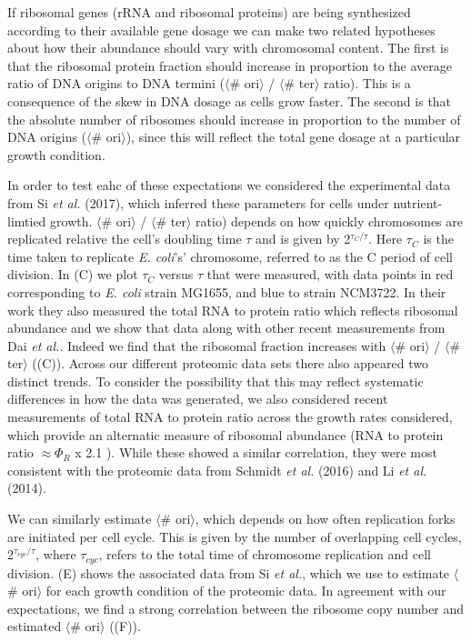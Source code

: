 If ribosomal genes (rRNA and ribosomal proteins) are being synthesized according
to their available gene dosage we can make two related hypotheses about how
their abundance should vary with chromosomal content. The first is that the
ribosomal protein fraction should increase in proportion  to the average ratio of
DNA origins to DNA termini ($\langle$\# ori$\rangle$ / $\langle$\# ter$\rangle$
ratio). This is a consequence of the skew in DNA dosage as cells grow faster.
The second is that the absolute number of ribosomes should increase in proportion to the number of DNA origins ($\langle$\# ori$\rangle$), since this will reflect the total gene dosage at a particular growth condition.

In order to test eahc of these expectations we considered the experimental data
from Si \textit{et al.} (2017), which inferred these parameters for cells under
nutrient-limtied growth. $\langle$\# ori$\rangle$ / $\langle$\# ter$\rangle$
ratio) depends on how quickly chromosomes are replicated relative the cell's
doubling time $\tau$ and is given by 2$^{\tau_C / \tau}$. Here $\tau_C$ is the
time taken to replicate \textit{E. coli}'s' chromosome, referred to as the C
period of cell division.  In (C) we plot $\tau_C$ versus
$\tau$ that were measured, with data points in red corresponding to \textit{E.
coli} strain MG1655, and blue to strain NCM3722. In their work they also
measured the total RNA to protein ratio  which reflects ribosomal abundance and
we show that data along with other recent  measurements from Dai \textit{et
al.}. Indeed we find that the ribosomal fraction increases with $\langle$\#
ori$\rangle$ / $\langle$\# ter$\rangle$ ((C)). Across our
different proteomic data sets there also appeared two distinct trends. To
consider the possibility that this may reflect systematic differences in how the
data was generated, we also considered recent measurements of total RNA to
protein ratio across the growth rates considered, which provide an alternatic
measure of ribosomal abundance (RNA to protein ratio $\approx \Phi_R$ x 2.1
\cite{dai2016}). While these showed a similar correlation, they were most
consistent with the proteomic data from Schmidt \textit{et al.} (2016) and Li
\textit{et al.} (2014).

We can similarly estimate $\langle$\# ori$\rangle$, which depends on how often
replication forks are initiated per cell cycle. This is given by the number of
overlapping cell cycles,  2$^{\tau_{cyc} / \tau}$, where $\tau_{cyc}$, refers to
the total time of chromosome replication and cell division.
(E) shows the associated data from Si \textit{et al.},
which we use to estimate $\langle$\# ori$\rangle$  for each growth condition of
the proteomic data. In agreement with our expectations, we find a strong
correlation between the ribosome copy number and estimated $\langle$\#
ori$\rangle$ ((F)).

